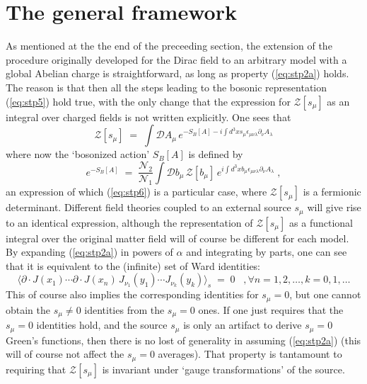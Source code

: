 \documentclass[a4paper,12pt]{article}
\begin{document}
\section{The general framework}\label{general}
As mentioned at the the end of the preceeding section, the extension
of the procedure originally developed for the Dirac field to an
arbitrary model with a global Abelian charge is straightforward, as
long as property (\ref{eq:stp2a}) holds. The reason is that then all
the steps leading to the bosonic representation (\ref{eq:stp5}) hold
true, with the only change that the expression for ${\mathcal Z}[s_\mu]$
as an integral over charged fields is not written explicitly.  One
sees that
\begin{equation}
 \label{eq:gen1}
  {\mathcal Z}[s_\mu] \;=\; \int {\mathcal D}A_\mu \,
e^{-S_B[A] - i \int d^3x s_\mu \epsilon_{\mu\nu\lambda}\partial_\nu A_\lambda}
\end{equation}
where now the `bosonized action' $S_B[A]$ is defined by
\begin{equation}
  \label{eq:gen2}
e^{- S_B[A]} \;=\; \frac{{\mathcal N}_2}{{\mathcal N}_1}
 \int {\mathcal D} b_\mu \,{\mathcal Z}[b_\mu] \,
 e^{i\int d^3 x b_\mu \epsilon_{\mu\nu\lambda} \partial_\nu
   A_\lambda} \;,
\end{equation}
an expression of which (\ref{eq:stp6}) is a particular case, where
${\mathcal Z}[s_\mu]$ is a fermionic determinant. Different field
theories coupled to an external source $s_\mu$ will give rise to an
identical expression, although the representation of ${\mathcal
  Z}[s_\mu]$ as a functional integral over the original matter field
will of course be different for each model. By expanding
(\ref{eq:stp2a}) in powers of $\alpha$ and integrating by parts, one
can see that it is equivalent to the (infinite) set of Ward
identities:
\begin{equation}
  \label{eq:wi}
  \langle \partial \cdot J(x_1) \cdots \partial \cdot J(x_n) \,
J_{\nu_1}(y_1) \cdots J_{\nu_k} (y_k) \rangle_s \;=\;0 \;\;\;, \forall n=1,2,
\ldots, k=0,1,\ldots
\end{equation}
This of course also implies the corresponding identities for $s_\mu =
0$, but one cannot obtain the $s_\mu \neq 0$ identities from the $s_\mu
= 0$ ones. If one just requires that the $s_\mu = 0$ identities hold,
and the source $s_\mu$ is only an artifact to derive $s_\mu = 0$
Green's functions, then there is no lost of generality in assuming
(\ref{eq:stp2a}) (this will of course not affect the $s_\mu=0$
averages). That property is tantamount to requiring that ${\mathcal
  Z}[s_\mu]$ is invariant under `gauge transformations' of the source.
\end{document}
